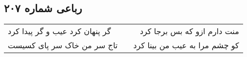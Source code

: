 \begin{center}
\section*{رباعی شماره ۲۰۷}
\label{sec:sh207}
\begin{longtable}{l p{0.5cm} r}
گر پنهان کرد عیب و گر پیدا کرد
&&
منت دارم ازو که بس برجا کرد
\\
تاج سر من خاک سر پای کسیست
&&
کو چشم مرا به عیب من بینا کرد
\\
\end{longtable}
\end{center}
